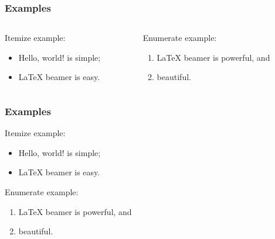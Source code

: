 \documentclass{beamer}
\begin{document}
 \begin{frame}\frametitle{Examples}
   \begin{columns}
     \begin{column}{.5\textwidth}
       \begin{example}
         Itemize example:
         \begin{itemize}
         \item Hello, world! is simple;
         \item \LaTeX{} beamer is easy.
         \end{itemize}
       \end{example}
     \end{column}
     \begin{column}{.5\textwidth}
       \begin{exampleblock}{Enumerate example:}
         \begin{enumerate}
         \item \LaTeX{} beamer is powerful, and
         \item beautiful.
         \end{enumerate}
       \end{exampleblock}
     \end{column}
   \end{columns}
 \end{frame}

 \begin{frame}\frametitle{Examples}
   Itemize example: \pause
   \begin{itemize}
   \item Hello, world! is simple;  \pause
   \item \LaTeX{} beamer is easy. \pause
   \end{itemize}
   Enumerate example: \pause
   \begin{enumerate}
   \item \LaTeX{} beamer is powerful, and \pause
   \item beautiful. \pause
   \end{enumerate}
 \end{frame}
\end{document}
